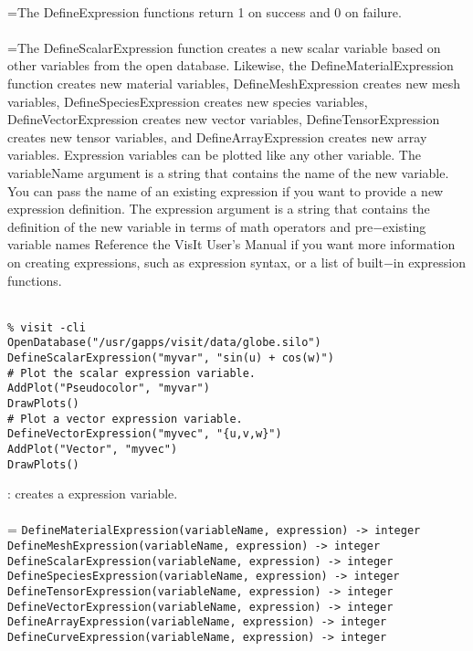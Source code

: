 \documentclass[10pt,a4paper]{report}
\begin{document}
 \\ 
\hangindent=\parindent The DefineExpression functions return 1 on success and 0 on failure. \\[-3mm] 

 \\ 
\hangindent=\parindent The DefineScalarExpression function creates a new scalar variable based on other variables from the open database. Likewise, the DefineMaterialExpression function creates new material variables, DefineMeshExpression creates new mesh variables, DefineSpeciesExpression creates new species variables, DefineVectorExpression creates new vector variables, DefineTensorExpression creates new tensor variables, and DefineArrayExpression creates new array variables. Expression variables can be plotted like any other variable. The variableName argument is a string that contains the name of the new variable. You can pass the name of an existing expression if you want to provide a new expression definition. The expression argument is a string that contains the definition of the new variable in terms of math operators and pre$-$existing variable names Reference the VisIt User's Manual if you want more information on  creating expressions, such as expression syntax, or a list of built$-$in expression functions. \\[-3mm] 

\\[-6mm]
\begin{verbatim}% visit -cli
OpenDatabase("/usr/gapps/visit/data/globe.silo")
DefineScalarExpression("myvar", "sin(u) + cos(w)")
# Plot the scalar expression variable.
AddPlot("Pseudocolor", "myvar")
DrawPlots()
# Plot a vector expression variable.
DefineVectorExpression("myvec", "{u,v,w}")
AddPlot("Vector", "myvec")
DrawPlots()
\end{verbatim}
\newpage


{}
: creates a expression variable.\\[-3mm]

 \\ 
\hangindent=\parindent 
\verb!DefineMaterialExpression(variableName, expression) -> integer!\\ 
\verb!DefineMeshExpression(variableName, expression) -> integer!\\ 
\verb!DefineScalarExpression(variableName, expression) -> integer!\\ 
\verb!DefineSpeciesExpression(variableName, expression) -> integer!\\ 
\verb!DefineTensorExpression(variableName, expression) -> integer!\\ 
\verb!DefineVectorExpression(variableName, expression) -> integer!\\ 
\verb!DefineArrayExpression(variableName, expression) -> integer!\\ 
\verb!DefineCurveExpression(variableName, expression) -> integer!\\ [-3mm]
\end{document}

